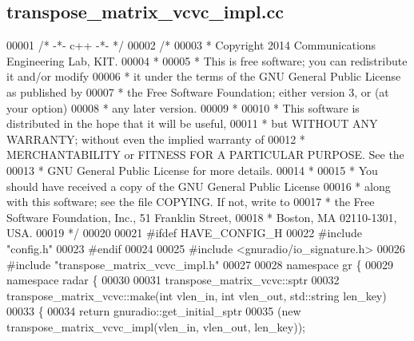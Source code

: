 \subsection{transpose\+\_\+matrix\+\_\+vcvc\+\_\+impl.\+cc}
\label{transpose__matrix__vcvc__impl_8cc_source}

\begin{DoxyCode}
00001 \textcolor{comment}{/* -*- c++ -*- */}
00002 \textcolor{comment}{/* }
00003 \textcolor{comment}{ * Copyright 2014 Communications Engineering Lab, KIT.}
00004 \textcolor{comment}{ * }
00005 \textcolor{comment}{ * This is free software; you can redistribute it and/or modify}
00006 \textcolor{comment}{ * it under the terms of the GNU General Public License as published by}
00007 \textcolor{comment}{ * the Free Software Foundation; either version 3, or (at your option)}
00008 \textcolor{comment}{ * any later version.}
00009 \textcolor{comment}{ * }
00010 \textcolor{comment}{ * This software is distributed in the hope that it will be useful,}
00011 \textcolor{comment}{ * but WITHOUT ANY WARRANTY; without even the implied warranty of}
00012 \textcolor{comment}{ * MERCHANTABILITY or FITNESS FOR A PARTICULAR PURPOSE.  See the}
00013 \textcolor{comment}{ * GNU General Public License for more details.}
00014 \textcolor{comment}{ * }
00015 \textcolor{comment}{ * You should have received a copy of the GNU General Public License}
00016 \textcolor{comment}{ * along with this software; see the file COPYING.  If not, write to}
00017 \textcolor{comment}{ * the Free Software Foundation, Inc., 51 Franklin Street,}
00018 \textcolor{comment}{ * Boston, MA 02110-1301, USA.}
00019 \textcolor{comment}{ */}
00020 
00021 \textcolor{preprocessor}{#ifdef HAVE\_CONFIG\_H}
00022 \textcolor{preprocessor}{#include "config.h"}
00023 \textcolor{preprocessor}{#endif}
00024 
00025 \textcolor{preprocessor}{#include <gnuradio/io\_signature.h>}
00026 \textcolor{preprocessor}{#include "transpose_matrix_vcvc_impl.h"}
00027 
00028 \textcolor{keyword}{namespace }gr \{
00029   \textcolor{keyword}{namespace }radar \{
00030 
00031     transpose_matrix_vcvc::sptr
00032     transpose_matrix_vcvc::make(\textcolor{keywordtype}{int} vlen\_in, \textcolor{keywordtype}{int} vlen\_out, std::string len\_key)
00033     \{
00034       \textcolor{keywordflow}{return} gnuradio::get\_initial\_sptr
00035         (\textcolor{keyword}{new} transpose_matrix_vcvc_impl(vlen\_in, vlen\_out, len\_key));

\end{DoxyCode}
